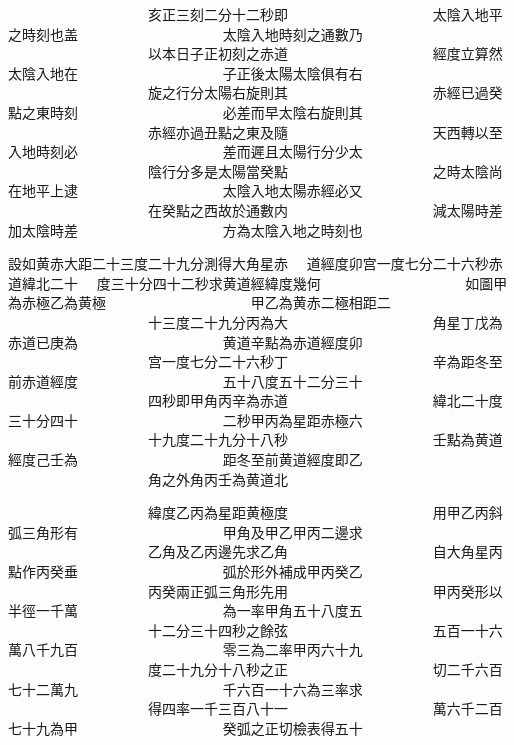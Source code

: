 \begin{正文}
　　　　　　　　　　亥正三刻二分十二秒即
　　　　　　　　　　太陰入地平之時刻也盖
　　　　　　　　　　太陰入地時刻之通數乃
　　　　　　　　　　以本日子正初刻之赤道
　　　　　　　　　　經度立算然太陰入地在
　　　　　　　　　　子正後太陽太陰俱有右
　　　　　　　　　　旋之行分太陽右旋則其
　　　　　　　　　　赤經已過癸點之東時刻
　　　　　　　　　　必差而早太陰右旋則其
　　　　　　　　　　赤經亦過丑點之東及隨
　　　　　　　　　　天西轉以至入地時刻必
　　　　　　　　　　差而遲且太陽行分少太
　　　　　　　　　　陰行分多是太陽當癸點
　　　　　　　　　　之時太陰尚在地平上逮
　　　　　　　　　　太陰入地太陽赤經必又
　　　　　　　　　　在癸點之西故於通數内
　　　　　　　　　　減太陽時差加太陰時差
　　　　　　　　　　方為太陰入地之時刻也
\par
\end{正文}\clearpage
{}
\begin{正文}
設如黄赤大距二十三度二十九分測得大角星赤
　道經度卯宫一度七分二十六秒赤道緯北二十
　度三十分四十二秒求黄道經緯度幾何
　　　　　　　　　　如圖甲為赤極乙為黄極
　　　　　　　　　　甲乙為黄赤二極相距二
　　　　　　　　　　十三度二十九分丙為大
　　　　　　　　　　角星丁戊為赤道已庚為
　　　　　　　　　　黄道辛點為赤道經度卯
　　　　　　　　　　宫一度七分二十六秒丁
　　　　　　　　　　辛為距冬至前赤道經度
　　　　　　　　　　五十八度五十二分三十
　　　　　　　　　　四秒即甲角丙辛為赤道
　　　　　　　　　　緯北二十度三十分四十
　　　　　　　　　　二秒甲丙為星距赤極六
　　　　　　　　　　十九度二十九分十八秒
　　　　　　　　　　壬點為黄道經度己壬為
　　　　　　　　　　距冬至前黄道經度即乙
　　　　　　　　　　角之外角丙壬為黄道北
\par
\end{正文}\clearpage
{}
\begin{正文}
　　　　　　　　　　緯度乙丙為星距黄極度
　　　　　　　　　　用甲乙丙斜弧三角形有
　　　　　　　　　　甲角及甲乙甲丙二邊求
　　　　　　　　　　乙角及乙丙邊先求乙角
　　　　　　　　　　自大角星丙點作丙癸垂
　　　　　　　　　　弧於形外補成甲丙癸乙
　　　　　　　　　　丙癸兩正弧三角形先用
　　　　　　　　　　甲丙癸形以半徑一千萬
　　　　　　　　　　為一率甲角五十八度五
　　　　　　　　　　十二分三十四秒之餘弦
　　　　　　　　　　五百一十六萬八千九百
　　　　　　　　　　零三為二率甲丙六十九
　　　　　　　　　　度二十九分十八秒之正
　　　　　　　　　　切二千六百七十二萬九
　　　　　　　　　　千六百一十六為三率求
　　　　　　　　　　得四率一千三百八十一
　　　　　　　　　　萬六千二百七十九為甲
　　　　　　　　　　癸弧之正切檢表得五十
\par
\end{正文}\clearpage
